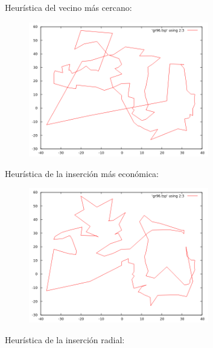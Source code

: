\documentclass[11pt,a4paper]{article}
\begin{document}
\newpage

				\par
				Heurística del vecino más cercano:

				\vspace{5mm}

				\begin{figure}[h]

					\centering
					\includegraphics[width=0.7\textwidth]{gr96VMC.png}
					
				\end{figure}

				\par
				Heurística de la inserción más económica:

				\vspace{5mm}

				\begin{figure}[h]

					\centering
					\includegraphics[width=0.7\textwidth]{gr96IM.png}
					
				\end{figure}

\newpage

				\par
				Heurística de la inserción radial:
\end{document}

